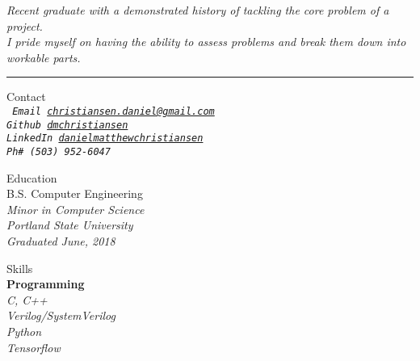 \documentclass{article}
\newcommand\leftcolwidthvar{0.35}
\begin{document}
\begin{center}
\textsf{\textit{%
Recent graduate with a demonstrated history of tackling the core problem of a project.\\
I pride myself on having the ability to assess problems and break them down into workable parts.}}
\end{center}
\begin{center}
\rule{0.80\textwidth}{.4pt}
\end{center}
\medskip
%
%
\noindent
\colorbox{light-gray}{%
\begin{minipage}[t]{\leftcolwidthvar \textwidth}
%
%
\begin{flushleft}
\textsf{\Large Contact}\\
\smallskip
\texttt{\textit{%
Email \href{mailto:christiansen.daniel@gmail.com}{christiansen.daniel@gmail.com}\\
Github \href{https://github.com/dmchristiansen}{dmchristiansen}\\
LinkedIn \href{https://www.linkedin.com/in/danielmatthewchristiansen/}{danielmatthewchristiansen}\\
Ph\# (503) 952-6047\\}}
\end{flushleft}
%
%
\vspace{0.5ex}
\begin{flushleft}
\textsf{\Large Education}\\
\smallskip
B.S. Computer Engineering\\ 
\textsf{\textit{%
Minor in Computer Science\\
Portland State University\\
Graduated June, 2018\\}}
\end{flushleft}
%
%
\vspace{0.5ex}
\begin{flushleft}
\textsf{\Large Skills}\\
\medskip
\textbf{Programming\\\vspace{2pt}}
\textsf{\textit{%
C, C++\\\vspace{2pt}
Verilog/SystemVerilog\\\vspace{2pt}
Python \\\vspace{2pt}
Tensorflow\\\vspace{2pt}}}

\end{flushleft}
\end{minipage}}
\end{document}
